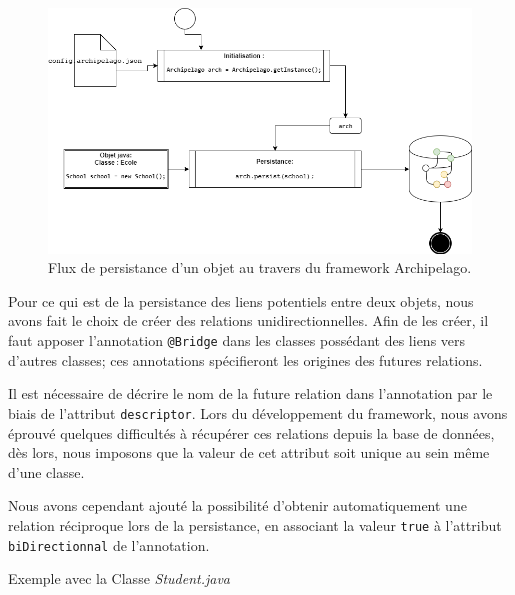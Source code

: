 \documentclass[a4paper,fleqn,12pt,oneside]{book}
\begin{document}
\begin{figure}[!h]
\centering
\includegraphics[scale=0.6]{figures/Persist.png}
\caption{Flux de persistance d'un objet au travers du framework Archipelago.}
\label{fig:Persist}
\end{figure}
    
\newpage
Pour ce qui est de la persistance des liens potentiels entre deux objets, nous avons fait le choix de créer des relations unidirectionnelles. Afin de les créer, il faut apposer l'annotation \texttt{@Bridge} dans les classes possédant des liens vers d'autres classes; ces annotations spécifieront les origines des futures relations.

Il est nécessaire de décrire le nom de la future relation dans l'annotation par le biais de l'attribut \texttt{descriptor}. Lors du développement du framework, nous avons éprouvé quelques difficultés à récupérer ces relations depuis la base de données, dès lors, nous imposons que la valeur de cet attribut soit unique au sein même d'une classe. 

Nous avons cependant ajouté la possibilité d'obtenir automatiquement une relation réciproque lors de la persistance, en associant la valeur \texttt{true} à l'attribut \texttt{biDirectionnal} de l'annotation. 

Exemple avec la Classe \textit{Student.java}
\end{document}
